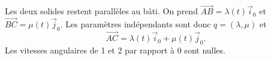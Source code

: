 \begin{corrigebox}
Les deux solides restent parallèles au bâti. On prend
$\overrightarrow{AB}=\lambda(t)\vec i_0$ et
$\overrightarrow{BC}=\mu(t)\vec j_0$. Les paramètres indépendants sont donc
$q=(\lambda,\mu)$ et
\[\overrightarrow{AC}=\lambda(t)\vec i_0+\mu(t)\vec j_0.\]
Les vitesses angulaires de 1 et 2 par rapport à 0 sont nulles.
\end{corrigebox}
